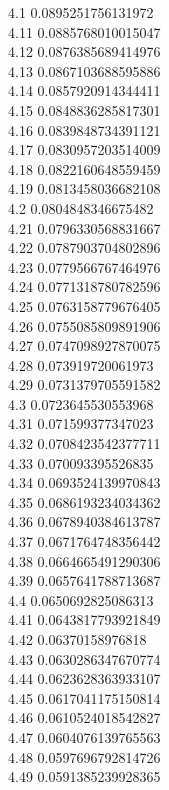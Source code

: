 {4.1	0.0895251756131972\\
4.11	0.0885768010015047\\
4.12	0.0876385689414976\\
4.13	0.0867103688595886\\
4.14	0.0857920914344411\\
4.15	0.0848836285817301\\
4.16	0.0839848734391121\\
4.17	0.0830957203514009\\
4.18	0.0822160648559459\\
4.19	0.0813458036682108\\
4.2	0.0804848346675482\\
4.21	0.0796330568831667\\
4.22	0.0787903704802896\\
4.23	0.0779566767464976\\
4.24	0.0771318780782596\\
4.25	0.0763158779676405\\
4.26	0.0755085809891906\\
4.27	0.0747098927870075\\
4.28	0.073919720061973\\
4.29	0.0731379705591582\\
4.3	0.0723645530553968\\
4.31	0.071599377347023\\
4.32	0.0708423542377711\\
4.33	0.070093395526835\\
4.34	0.0693524139970843\\
4.35	0.0686193234034362\\
4.36	0.0678940384613787\\
4.37	0.0671764748356442\\
4.38	0.0664665491290306\\
4.39	0.0657641788713687\\
4.4	0.0650692825086313\\
4.41	0.0643817793921849\\
4.42	0.06370158976818\\
4.43	0.0630286347670774\\
4.44	0.0623628363933107\\
4.45	0.0617041175150814\\
4.46	0.0610524018542827\\
4.47	0.0604076139765563\\
4.48	0.0597696792814726\\
4.49	0.0591385239928365\\
}
